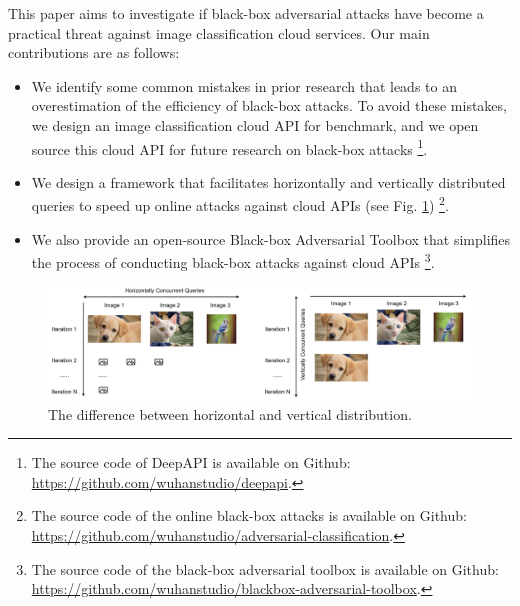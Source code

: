 This paper aims to investigate if black-box adversarial attacks have become a practical threat against image classification cloud services. Our main contributions are as follows: 

\begin{itemize}
    \item We identify some common mistakes in prior research that leads to an overestimation of the efficiency of black-box attacks. To avoid these mistakes, we design an image classification cloud API for benchmark, and we open source this cloud API for future research on black-box attacks
    \footnote{The source code of DeepAPI is available on Github: \url{https://github.com/wuhanstudio/deepapi}.}.
    \item We design a framework that facilitates horizontally and vertically distributed queries to speed up online attacks against cloud APIs (see Fig. \ref{fig:distributability})
    \footnote{The source code of the online black-box attacks is available on Github: \url{https://github.com/wuhanstudio/adversarial-classification}.}. 
    \item We also provide an open-source Black-box Adversarial Toolbox that simplifies the process of conducting black-box attacks against cloud APIs
    \footnote{The source code of the black-box adversarial toolbox is available on Github: \url{https://github.com/wuhanstudio/blackbox-adversarial-toolbox}.}.
    
\end{itemize}

\begin{figure}[H]
    \centering
    \includegraphics[width=\linewidth]{figures/chapter_classification/distribution.jpg}
    \caption{The difference between horizontal and vertical distribution.}
    \label{fig:distributability}
\end{figure}



